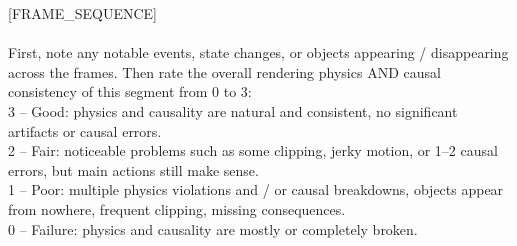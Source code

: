 \begin{tcolorbox}[d5box, title={Causal Fidelity --- Track 1: Rendering Physics \& Causal Consistency (0--3)}]
\begin{tcolorbox}[userprompt]
\mbox{[FRAME\_SEQUENCE]}\\
\\
First, note any notable events, state changes, or objects appearing / disappearing across the frames. Then rate the overall rendering physics AND causal consistency of this segment from 0 to 3:\\
  3 -- Good: physics and causality are natural and consistent, no significant artifacts or causal errors.\\
  2 -- Fair: noticeable problems such as some clipping, jerky motion, or 1--2 causal errors, but main actions still make sense.\\
  1 -- Poor: multiple physics violations and / or causal breakdowns, objects appear from nowhere, frequent clipping, missing consequences.\\
  0 -- Failure: physics and causality are mostly or completely broken.
\end{tcolorbox}
\end{tcolorbox}

\vspace{6pt}

